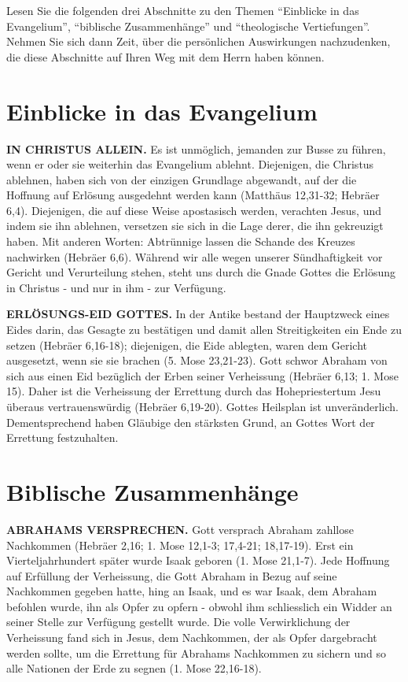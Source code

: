 \documentclass[
  12pt,
]{krantz}
\begin{document}
Lesen Sie die folgenden drei Abschnitte zu den Themen ``Einblicke in das Evangelium'', ``biblische Zusammenhänge'' und ``theologische Vertiefungen''. Nehmen Sie sich dann Zeit, über die persönlichen Auswirkungen nachzudenken, die diese Abschnitte auf Ihren Weg mit dem Herrn haben können.

\hypertarget{einblicke-in-das-evangelium}{%
\section{Einblicke in das Evangelium}\label{einblicke-in-das-evangelium}}

\textbf{IN CHRISTUS ALLEIN.} Es ist unmöglich, jemanden zur Busse zu führen, wenn er oder sie weiterhin das Evangelium ablehnt. Diejenigen, die Christus ablehnen, haben sich von der einzigen Grundlage abgewandt, auf der die Hoffnung auf Erlösung ausgedehnt werden kann (Matthäus 12,31-32; Hebräer 6,4). Diejenigen, die auf diese Weise apostasisch werden, verachten Jesus, und indem sie ihn ablehnen, versetzen sie sich in die Lage derer, die ihn gekreuzigt haben. Mit anderen Worten: Abtrünnige lassen die Schande des Kreuzes nachwirken (Hebräer 6,6). Während wir alle wegen unserer Sündhaftigkeit vor Gericht und Verurteilung stehen, steht uns durch die Gnade Gottes die Erlösung in Christus - und nur in ihm - zur Verfügung.

\textbf{ERLÖSUNGS-EID GOTTES.} In der Antike bestand der Hauptzweck eines Eides darin, das Gesagte zu bestätigen und damit allen Streitigkeiten ein Ende zu setzen (Hebräer 6,16-18); diejenigen, die Eide ablegten, waren dem Gericht ausgesetzt, wenn sie sie brachen (5. Mose 23,21-23). Gott schwor Abraham von sich aus einen Eid bezüglich der Erben seiner Verheissung (Hebräer 6,13; 1. Mose 15). Daher ist die Verheissung der Errettung durch das Hohepriestertum Jesu überaus vertrauenswürdig (Hebräer 6,19-20). Gottes Heilsplan ist unveränderlich. Dementsprechend haben Gläubige den stärksten Grund, an Gottes Wort der Errettung festzuhalten.

\hypertarget{biblische-zusammenhuxe4nge}{%
\section{Biblische Zusammenhänge}\label{biblische-zusammenhuxe4nge}}

\textbf{ABRAHAMS VERSPRECHEN.} Gott versprach Abraham zahllose Nachkommen (Hebräer 2,16; 1. Mose 12,1-3; 17,4-21; 18,17-19). Erst ein Vierteljahrhundert später wurde Isaak geboren (1. Mose 21,1-7). Jede Hoffnung auf Erfüllung der Verheissung, die Gott Abraham in Bezug auf seine Nachkommen gegeben hatte, hing an Isaak, und es war Isaak, dem Abraham befohlen wurde, ihn als Opfer zu opfern - obwohl ihm schliesslich ein Widder an seiner Stelle zur Verfügung gestellt wurde. Die volle Verwirklichung der Verheissung fand sich in Jesus, dem Nachkommen, der als Opfer dargebracht werden sollte, um die Errettung für Abrahams Nachkommen zu sichern und so alle Nationen der Erde zu segnen (1. Mose 22,16-18).
\end{document}
